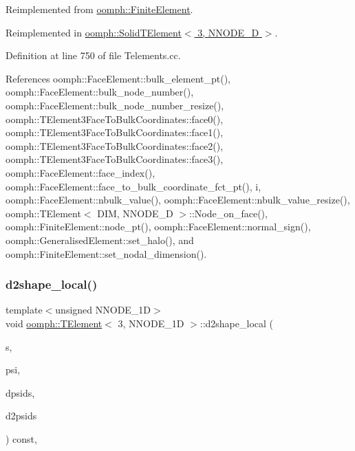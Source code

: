 Reimplemented from \hyperlink{classoomph_1_1FiniteElement_aaf7bead5b462cfd5401d97b3dbdc7af7}{oomph\+::\+Finite\+Element}.



Reimplemented in \hyperlink{classoomph_1_1SolidTElement_3_013_00_01NNODE__1D_01_4_ae363063452694a9412fc9a668730d1fd}{oomph\+::\+Solid\+T\+Element$<$ 3, N\+N\+O\+D\+E\+\_\+D $>$}.



Definition at line 750 of file Telements.\+cc.



References oomph\+::\+Face\+Element\+::bulk\+\_\+element\+\_\+pt(), oomph\+::\+Face\+Element\+::bulk\+\_\+node\+\_\+number(), oomph\+::\+Face\+Element\+::bulk\+\_\+node\+\_\+number\+\_\+resize(), oomph\+::\+T\+Element3\+Face\+To\+Bulk\+Coordinates\+::face0(), oomph\+::\+T\+Element3\+Face\+To\+Bulk\+Coordinates\+::face1(), oomph\+::\+T\+Element3\+Face\+To\+Bulk\+Coordinates\+::face2(), oomph\+::\+T\+Element3\+Face\+To\+Bulk\+Coordinates\+::face3(), oomph\+::\+Face\+Element\+::face\+\_\+index(), oomph\+::\+Face\+Element\+::face\+\_\+to\+\_\+bulk\+\_\+coordinate\+\_\+fct\+\_\+pt(), i, oomph\+::\+Face\+Element\+::nbulk\+\_\+value(), oomph\+::\+Face\+Element\+::nbulk\+\_\+value\+\_\+resize(), oomph\+::\+T\+Element$<$ D\+I\+M, N\+N\+O\+D\+E\+\_\+D $>$\+::\+Node\+\_\+on\+\_\+face(), oomph\+::\+Finite\+Element\+::node\+\_\+pt(), oomph\+::\+Face\+Element\+::normal\+\_\+sign(), oomph\+::\+Generalised\+Element\+::set\+\_\+halo(), and oomph\+::\+Finite\+Element\+::set\+\_\+nodal\+\_\+dimension().

\mbox{\label{classoomph_1_1TElement_3_013_00_01NNODE__1D_01_4_a504635eec7569c7c7d07888f35e04bf5}} 
\subsubsection{\texorpdfstring{d2shape\+\_\+local()}{d2shape\_local()}}
{\footnotesize\ttfamily template$<$unsigned N\+N\+O\+D\+E\+\_\+1D$>$ \\
void \hyperlink{classoomph_1_1TElement}{oomph\+::\+T\+Element}$<$ 3, N\+N\+O\+D\+E\+\_\+1D $>$\+::d2shape\+\_\+local (\begin{DoxyParamCaption}\item[{const \hyperlink{classoomph_1_1Vector}{Vector}$<$ double $>$ \&}]{s,  }\item[{\hyperlink{classoomph_1_1Shape}{Shape} \&}]{psi,  }\item[{\hyperlink{classoomph_1_1DShape}{D\+Shape} \&}]{dpsids,  }\item[{\hyperlink{classoomph_1_1DShape}{D\+Shape} \&}]{d2psids }\end{DoxyParamCaption}) const\hspace{0.3cm}{\ttfamily [inline]}, {\ttfamily [virtual]}}



